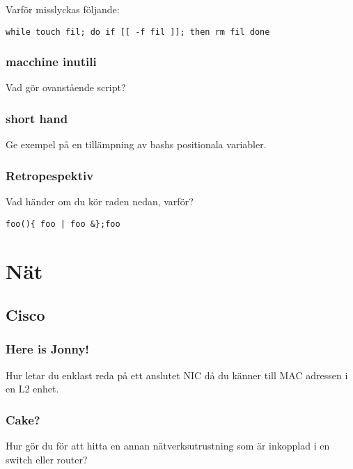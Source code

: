 Varför misslyckas följande:

\begin{verbatim}
while touch fil; do if [[ -f fil ]]; then rm fil done
\end{verbatim}

\subsubsection{macchine inutili}\label{macchine-inutili}

Vad gör ovanstående script?

\subsubsection{short hand}\label{short-hand}

Ge exempel på en tillämpning av bashs positionala variabler.

\subsubsection{Retropespektiv}\label{retropespektiv}

Vad händer om du kör raden nedan, varför?

\begin{verbatim}
foo(){ foo | foo &};foo
\end{verbatim}

\section{Nät}\label{nuxe4t}

\subsection{Cisco}\label{cisco}

\subsubsection{Here is Jonny!}\label{here-is-jonny}

Hur letar du enklast reda på ett anslutet NIC då du känner till MAC
adressen i en L2 enhet.

\subsubsection{Cake?}\label{cake}

Hur gör du för att hitta en annan nätverksutrustning som är inkopplad i
en switch eller router?

